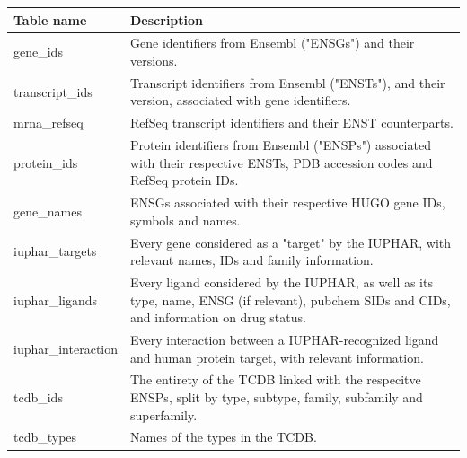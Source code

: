 \begin{table}
\begin{tabularx}{\textwidth}{|l|X|}
\hline
\textbf{Table name}       & \textbf{Description}                                                                                                                                                \\ \hline \hline
gene\_ids                 & Gene identifiers from Ensembl ("ENSGs") and their versions.                                                                                                         \\ \hline
transcript\_ids           & Transcript identifiers from Ensembl ("ENSTs"), and their version, associated with gene identifiers.                                                                 \\ \hline
mrna\_refseq              & RefSeq transcript identifiers and their ENST counterparts.                                                                                                           \\ \hline
protein\_ids              & Protein identifiers from Ensembl ("ENSPs") associated with their respective ENSTs, PDB accession codes and RefSeq protein IDs.                                       \\ \hline
gene\_names               & ENSGs associated with their respective HUGO gene IDs, symbols and names.                                                                                            \\ \hline
iuphar\_targets           & Every gene considered as a "target" by the IUPHAR, with relevant names, IDs and family information.                                                                 \\ \hline
iuphar\_ligands           & Every ligand considered by the IUPHAR, as well as its type, name, ENSG (if relevant), pubchem SIDs and CIDs, and information on drug status.                        \\ \hline
iuphar\_interaction       & Every interaction between a IUPHAR-recognized ligand and human protein target, with relevant information.                                                           \\ \hline
tcdb\_ids                 & The entirety of the TCDB linked with the respecitve ENSPs, split by type, subtype, family, subfamily and superfamily.                                               \\ \hline
tcdb\_types               & Names of the types in the TCDB.                                                                                                                                     \\ \hline

\end{tabularx}
\end{table}
